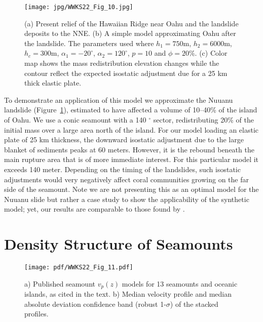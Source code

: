 \begin{figure}
\centering
\texttt{[image: jpg/WWKS22\_Fig\_10.jpg]}
\caption{(a) Present relief of the Hawaiian Ridge near Oahu and the landslide deposits to the NNE.
(b) A simple model approximating Oahu after the landslide.  The parameters used where $h_1 = 750$m, $h_2 = 6000$m,
$h_c = 300$m, $\alpha_1 = -20^{\circ}$, $\alpha_2 = 120^{\circ}$, $p = 10$ and $\phi = 20$\%.
(c) Color map shows the mass redistribution elevation changes while the contour reflect the expected isostatic adjustment due for a 25 km
thick elastic plate.}
\label{WWKS22_Fig_10}
\end{figure}
To demonstrate an application of this model we approximate the Nuuanu landslide (Figure~\ref{WWKS22_Fig_10}),
estimated to have affected a volume of 10--40\% of the island of Oahu. We use a conic seamount with a 140 $^{\circ}$ sector,
redistributing 20\% of the initial mass over a large area north of the island.  For our model loading an elastic plate
of 25 km thickness, the downward isostatic adjustment due to the large blanket of sediments peaks at 60 meters.  However, it is
the rebound beneath the main rupture area that is of more immediate interest.  For this particular model it exceeds
140 meter.  Depending on the timing of the landslides, such isostatic adjustments would very negatively affect coral
communities growing on the far side of the seamount. Note we are not presenting this as an optimal model for the Nuuanu
slide but rather a case study to show the applicability of the synthetic model; yet, our results are comparable to those found
by \citet{SW2000}.

\section{Density Structure of Seamounts}

\begin{figure}
\centering
\texttt{[image: pdf/WWKS22\_Fig\_11.pdf]}
\caption{a) Published seamount $v_p(z)$ models for 13 seamounts and oceanic islands, as cited in the text.
b) Median velocity profile and median absolute deviation confidence band (robust 1-$\sigma$) of the stacked profiles.}
\label{WWKS22_Fig_11}
\end{figure}

